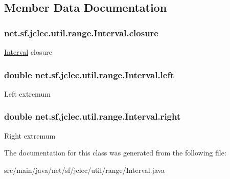 \subsection{Member Data Documentation}
\hypertarget{classnet_1_1sf_1_1jclec_1_1util_1_1range_1_1_interval_a3233c1fbd6f1dc6d660f2e147d850bf6}{
\subsubsection[{closure}]{ net.\-sf.\-jclec.\-util.\-range.\-Interval.\-closure\hspace{0.3cm}{\ttfamily [protected]}}}\label{classnet_1_1sf_1_1jclec_1_1util_1_1range_1_1_interval_a3233c1fbd6f1dc6d660f2e147d850bf6}
\hyperlink{classnet_1_1sf_1_1jclec_1_1util_1_1range_1_1_interval}{Interval} closure \hypertarget{classnet_1_1sf_1_1jclec_1_1util_1_1range_1_1_interval_aa25ee9b30f56b5a932764b8091db7f52}{
\subsubsection[{left}]{\setlength{\rightskip}{0pt plus 5cm}double net.\-sf.\-jclec.\-util.\-range.\-Interval.\-left\hspace{0.3cm}{\ttfamily [protected]}}}\label{classnet_1_1sf_1_1jclec_1_1util_1_1range_1_1_interval_aa25ee9b30f56b5a932764b8091db7f52}
Left extremum \hypertarget{classnet_1_1sf_1_1jclec_1_1util_1_1range_1_1_interval_ad657e25c0176501ea3bea8f25ece6bfc}{
\subsubsection[{right}]{\setlength{\rightskip}{0pt plus 5cm}double net.\-sf.\-jclec.\-util.\-range.\-Interval.\-right\hspace{0.3cm}{\ttfamily [protected]}}}\label{classnet_1_1sf_1_1jclec_1_1util_1_1range_1_1_interval_ad657e25c0176501ea3bea8f25ece6bfc}
Right extremum 

The documentation for this class was generated from the following file\-:\begin{DoxyCompactItemize}
\item 
src/main/java/net/sf/jclec/util/range/Interval.\-java\end{DoxyCompactItemize}
